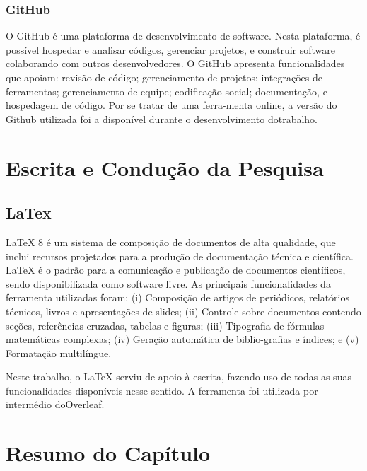 \subsubsection{GitHub}

O GitHub é uma plataforma de desenvolvimento de software. Nesta plataforma, é possível hospedar e analisar códigos, gerenciar projetos, e construir software colaborando com outros desenvolvedores. O GitHub apresenta funcionalidades que apoiam: revisão de código; gerenciamento de projetos; integrações de ferramentas; gerenciamento de equipe; codificação social; documentação, e hospedagem de código. Por se tratar de uma ferra-menta online, a versão do Github utilizada foi a disponível durante o desenvolvimento dotrabalho.

\section{Escrita e Condução da Pesquisa}

\subsection{LaTex}
LaTeX 8 é um sistema de composição de documentos de alta qualidade, que inclui recursos projetados para a produção de documentação técnica e científica. LaTeX é o padrão para a comunicação e publicação de documentos científicos, sendo disponibilizada como software livre. As principais funcionalidades da ferramenta utilizadas foram:
(i) Composição de artigos de periódicos, relatórios técnicos, livros e apresentações de slides;
(ii) Controle sobre documentos contendo seções, referências cruzadas, tabelas e figuras;
(iii) Tipografia de fórmulas matemáticas complexas; (iv) Geração automática de biblio-grafias e índices; e (v) Formatação multilíngue.

Neste trabalho, o LaTeX serviu de apoio à escrita, fazendo uso de todas as suas funcionalidades disponíveis nesse sentido. A ferramenta foi utilizada por intermédio doOverleaf.
\section{Resumo do Capítulo}

